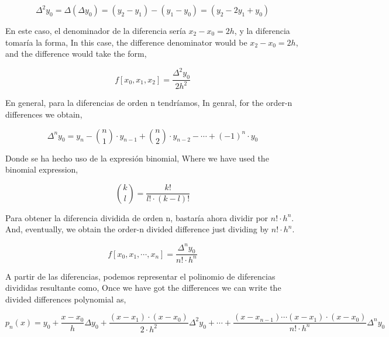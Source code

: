 \begin{equation*}
\Delta^2 y_0=\Delta \left(\Delta y_0 \right) =(y_2-y_1)-(y_1-y_0)=(y_2-2y_1+y_0)
\end{equation*}
\begin{paracol}{2}
En este caso, el denominador de la diferencia sería $x_2-x_0=2h$, y la diferencia tomaría la forma,
\switchcolumn
In this case, the difference denominator would be $x_2-x_0=2h$, and the difference would take the form,  
\end{paracol}
\begin{equation*}
f[x_0,x_1,x_2]=\frac{\Delta^2y_0}{2h^2}
\end{equation*}
\begin{paracol}{2}
En general, para la diferencias de orden n tendríamos,
\switchcolumn
In genral, for the order-n differences we obtain,

\end{paracol}
\begin{equation*}
\Delta^n y_0=y_n-\binom{n}{1}\cdot y_{n-1}+\binom{n}{2}\cdot y_{n-2}-\cdots+(-1)^n\cdot y_0
\end{equation*}
\begin{paracol}{2}
Donde se ha hecho uso de la expresión binomial,
\switchcolumn
Where we have used the binomial expression,
\end{paracol}
\begin{equation*}
\binom{k}{l}=\frac{k!}{l!\cdot(k-l)!}
\end{equation*}
\begin{paracol}{2}
Para obtener la diferencia dividida de orden n, bastaría ahora dividir por $n!\cdot h^n$.
\switchcolumn
And, eventually, we obtain the order-n divided difference just dividing by  $n!\cdot h^n$.
\end{paracol}
\begin{equation*}
f\left[x_0,x_1,\cdots,x_n\right]=\frac{\Delta^n y_0}{n!\cdot h^n}
\end{equation*}
\begin{paracol}{2}
A partir de las diferencias, podemos representar el polinomio de diferencias divididas resultante como,
\switchcolumn
Once we have got the differences we can write the divided differences polynomial as,

\end{paracol}
\begin{equation*}
p_n(x)=y_0+\frac{x-x_0}{h}\Delta y_0+\frac{(x-x_1)\cdot (x-x_0)}{2\cdot h^2}\Delta^2 y_0+\cdots +\frac{(x-x_{n-1}) \cdots (x-x_1)\cdot (x-x_0)}{n! \cdot h^n}\Delta^n y_0
\end{equation*}
